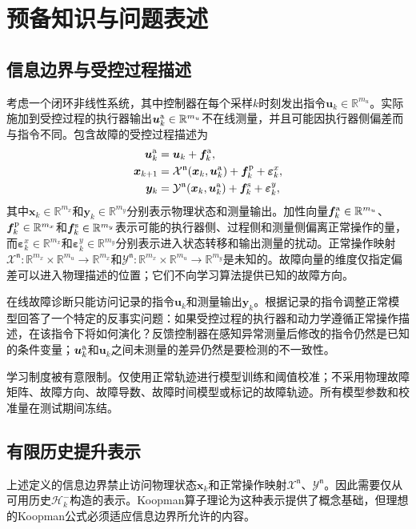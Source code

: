 \documentclass[journal]{IEEEtran}
\newcommand{\1}{\bm 1}
\begin{document}
\section{预备知识与问题表述}
\subsection{信息边界与受控过程描述}
考虑一个闭环非线性系统，其中控制器在每个采样$k$时刻发出指令$\bm u_k\in\mathbb R^{m_u}$。实际施加到受控过程的执行器输出$\bm u_k^{\rm a}\in\mathbb R^{m_u}$不在线测量，并且可能因执行器侧偏差而与指令不同。包含故障的受控过程描述为
\begin{equation}
\begin{aligned}
\bm u_k^{\rm a}&=\bm u_k+\bm f_k^{\rm a},\\
\bm x_{k+1}&=\mathcal X^{\mathfrak n}
(\bm x_k,\bm u_k^{\rm a})
+\bm f_k^{\rm p}+\bm\varepsilon_k^x,\\
\bm y_k&=\mathcal Y^{\mathfrak n}
(\bm x_k,\bm u_k^{\rm a})
+\bm f_k^{\rm s}+\bm\varepsilon_k^y,
\end{aligned}
\label{eq:controlled_process}
\end{equation}
其中$\bm x_k\in\mathbb R^{m_x}$和$\bm y_k\in\mathbb R^{m_y}$分别表示物理状态和测量输出。加性向量$\bm f_k^{\rm a}\in\mathbb R^{m_u}$、$\bm f_k^{\rm p}\in\mathbb R^{m_x}$和$\bm f_k^{\rm s}\in\mathbb R^{m_y}$表示可能的执行器侧、过程侧和测量侧偏离正常操作的量，而$\bm\varepsilon_k^x\in\mathbb R^{m_x}$和$\bm\varepsilon_k^y\in\mathbb R^{m_y}$分别表示进入状态转移和输出测量的扰动。正常操作映射$\mathcal X^{\mathfrak n}:\mathbb R^{m_x}\times\mathbb R^{m_u}\rightarrow\mathbb R^{m_x}$和$\mathcal Y^{\mathfrak n}:\mathbb R^{m_x}\times\mathbb R^{m_u}\rightarrow\mathbb R^{m_y}$是未知的。故障向量的维度仅指定偏差可以进入物理描述的位置；它们不向学习算法提供已知的故障方向。

在线故障诊断只能访问记录的指令$\bm u_k$和测量输出$\bm y_k$。根据记录的指令调整正常模型回答了一个特定的反事实问题：如果受控过程的执行器和动力学遵循正常操作描述，在该指令下将如何演化？反馈控制器在感知异常测量后修改的指令仍然是已知的条件变量；$\bm u_k^{\rm a}$和$\bm u_k$之间未测量的差异仍然是要检测的不一致性。

学习制度被有意限制。仅使用正常轨迹进行模型训练和阈值校准；不采用物理故障矩阵、故障方向、故障导数、故障时间模型或标记的故障轨迹。所有模型参数和校准量在测试期间冻结。

\subsection{有限历史提升表示}
上述定义的信息边界禁止访问物理状态$\bm x_k$和正常操作映射$\mathcal X^{\mathfrak n}$、$\mathcal Y^{\mathfrak n}$。因此需要仅从可用历史$\mathcal H_k^-$构造的表示。Koopman算子理论为这种表示提供了概念基础，但理想的Koopman公式必须适应信息边界所允许的内容。
\end{document}
